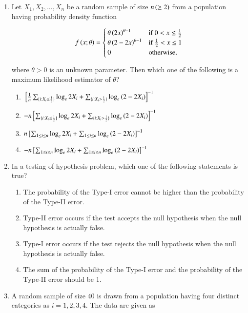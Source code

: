 \documentclass[journal]{IEEEtran}
\numberwithin{equation}{enumi}
\numberwithin{figure}{enumi}
\newcommand{\lt}{<}
\newcommand{\gt}{>}
\begin{document}
\begin{enumerate}
\item Let $X_1, X_2, ..., X_n$ be a random sample of size $n \left(\geq 2\right)$ from a population having probability density function

\[
f\brak{x; \theta} = \begin{cases}
\theta\brak{2x}^{\theta-1} & \text{if } 0 \lt x \leq \frac{1}{2} \\
\theta\brak{2-2x}^{\theta-1} & \text{if } \frac{1}{2} \lt x \leq 1 \\
0 & \text{otherwise,}
\end{cases}
\]

where $\theta \gt 0$ is an unknown parameter. Then which one of the following is a maximum likelihood estimator of $\theta$?

\begin{enumerate}
    \item $\sbrak{\frac{1}{n} \sum_{\{i: X_i \leq \frac{1}{2}\}} \log_e 2X_i + \sum_{\{i: X_i \gt \frac{1}{2}\}} \log_e \brak{2-2X_i}}^{-1}$
    \item $-n \sbrak{\sum_{\{i: X_i \leq \frac{1}{2}\}} \log_e 2X_i + \sum_{\{i: X_i \gt \frac{1}{2}\}} \log_e \brak{2-2X_i}}^{-1}$
    \item $n {}\left[\sum_{1 \leq i \leq n} \log_e 2X_i + \sum_{1 \leq i \leq n} \log_e \left(2-2X_i\right)\right]^{-1}$
    \item $-n {}\left[\sum_{1 \leq i \leq n} \log_e 2X_i + \sum_{1 \leq i \leq n} \log_e \left(2-2X_i\right)\right]^{-1}$
\end{enumerate}

\item In a testing of hypothesis problem, which one of the following statements is true?

\begin{enumerate}
    \item The probability of the Type-I error cannot be higher than the probability of the Type-II error.
    \item Type-II error occurs if the test accepts the null hypothesis when the null hypothesis is actually false.
    \item Type-I error occurs if the test rejects the null hypothesis when the null hypothesis is actually false.
    \item The sum of the probability of the Type-I error and the probability of the Type-II error should be 1.
\end{enumerate}

\item A random sample of size $40$ is drawn from a population having four distinct categories as $i = 1, 2, 3, 4$. The data are given as


\end{enumerate}
\end{document}
